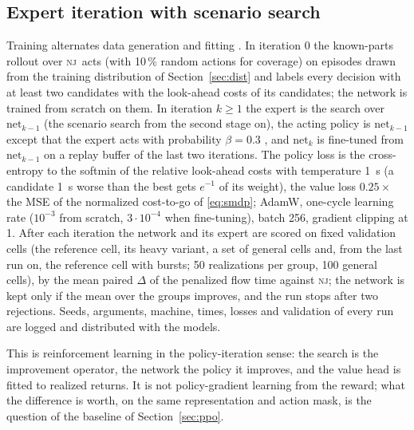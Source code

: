 \documentclass[11pt,a4paper]{article}
\theoremstyle{plain}
\theoremstyle{definition}
\theoremstyle{remark}
\newcommand{\nj}{\textsc{nj}}
\begin{document}
\subsection{Expert iteration with scenario search}
Training alternates data generation and fitting \cite{Anthony2017,Silver2018}. In
iteration 0 the known-parts rollout over \nj\ acts (with 10\,\% random actions for
coverage) on episodes drawn from the training distribution of Section~\ref{sec:dist} and
labels every decision with at least two candidates with the look-ahead costs of its
candidates; the network is trained from scratch on them. In iteration $k\ge1$ the expert
is the search over $\mathrm{net}_{k-1}$ (the scenario search from the second stage on),
the acting policy is $\mathrm{net}_{k-1}$ except that the expert acts with probability
$\beta=0.3$ \cite{Ross2011}, and $\mathrm{net}_k$ is fine-tuned from $\mathrm{net}_{k-1}$
on a replay buffer of the last two iterations. The policy loss is the cross-entropy to the
softmin of the relative look-ahead costs with temperature 1~s (a candidate 1~s worse than
the best gets $e^{-1}$ of its weight), the value loss $0.25\times$ the MSE of the
normalized cost-to-go of \eqref{eq:smdp}; AdamW, one-cycle learning rate ($10^{-3}$ from
scratch, $3\cdot10^{-4}$ when fine-tuning), batch 256, gradient clipping at 1. After each
iteration the network and its expert are scored on fixed validation cells (the reference
cell, its heavy variant, a set of general cells and, from the last run on, the reference
cell with bursts; 50 realizations per group, 100 general cells), by the mean paired
$\Delta$ of the penalized flow time against \nj; the network is kept only if the mean over
the groups improves, and the run stops after two rejections. Seeds, arguments, machine,
times, losses and validation of every run are logged and distributed with the models.

This is reinforcement learning in the policy-iteration sense: the search is the
improvement operator, the network the policy it improves, and the value head is fitted
to realized returns. It is not policy-gradient learning from the reward; what the
difference is worth, on the same representation and action mask, is the question of the
baseline of Section~\ref{sec:ppo}.
\end{document}
